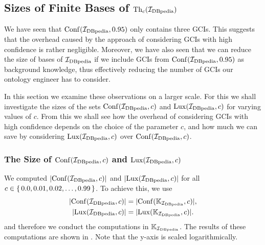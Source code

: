 \subsection{Sizes of Finite Bases of $\operatorname{Th}_c({\mathcal{I}_{\text{DBpedia}}})$}
\label{sec:sizes-finite-bases}

We have seen that $\operatorname{Conf}({\mathcal{I}_{\text{DBpedia}}}, 0.95)$ only contains three GCIs.  This suggests that
the overhead caused by the approach of considering GCIs with high confidence is rather
negligible.  Moreover, we have also seen that we can reduce the size of bases of
${\mathcal{I}_{\text{DBpedia}}}$ if we include GCIs from $\operatorname{Conf}({\mathcal{I}_{\text{DBpedia}}}, 0.95)$ as background knowledge, thus
effectively reducing the number of GCIs our ontology engineer has to consider.

In this section we examine these observations on a larger scale.  For this we shall
investigate the sizes of the sets $\operatorname{Conf}({\mathcal{I}_{\text{DBpedia}}}, c)$ and $\operatorname{Lux}({\mathcal{I}_{\text{DBpedia}}}, c)$ for
varying values of $c$.  From this we shall see how the overhead of considering GCIs with
high confidence depends on the choice of the parameter $c$, and how much we can save by
considering $\operatorname{Lux}({\mathcal{I}_{\text{DBpedia}}}, c)$ over $\operatorname{Conf}({\mathcal{I}_{\text{DBpedia}}}, c)$.

\subsubsection{The Size of $\operatorname{Conf}({\mathcal{I}_{\text{DBpedia}}},c)$ and $\operatorname{Lux}({\mathcal{I}_{\text{DBpedia}}}, c)$}
\label{sec:size-confidbpedia-c}

We computed $\lvert \operatorname{Conf}({\mathcal{I}_{\text{DBpedia}}}, c) \rvert$ and $\lvert \operatorname{Lux}({\mathcal{I}_{\text{DBpedia}}}, c) \rvert$ for all $c \in
{\ensuremath{\{\, 0.0, 0.01, 0.02, \dots, 0.99 \,\}}}$.  To achieve this, we use
\begin{align*}
  \lvert \operatorname{Conf}({\mathcal{I}_{\text{DBpedia}}}, c) \rvert &= \lvert \operatorname{Conf}({\mathbb{K}}_{\mathcal{I}_{\text{DBpedia}}}, c) \rvert, \\
  \lvert \operatorname{Lux}({\mathcal{I}_{\text{DBpedia}}}, c) \rvert &= \lvert \operatorname{Lux}({\mathbb{K}}_{\mathcal{I}_{\text{DBpedia}}}, c) \rvert.
\end{align*}
and therefore we conduct the computations in ${\mathbb{K}}_{\mathcal{I}_{\text{DBpedia}}}$.  The results of these
computations are shown in .  Note that the y-axis is scaled
logarithmically.


